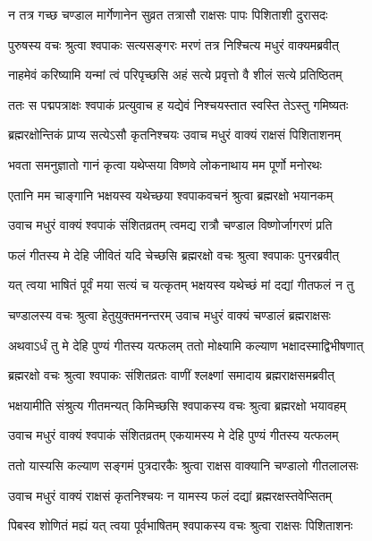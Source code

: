 \twolineshloka
{न तत्र गच्छ चण्डाल मार्गेणानेन सुव्रत}
{तत्रासौ राक्षसः पापः पिशिताशी दुरासदः}%

\twolineshloka
{पुरुषस्य वचः श्रुत्वा श्वपाकः सत्यसङ्गरः}
{मरणं तत्र निश्चित्य मधुरं वाक्यमब्रवीत्}%

\twolineshloka
{नाहमेवं करिष्यामि यन्मां त्वं परिपृच्छसि}
{अहं सत्ये प्रवृत्तो वै शीलं सत्ये प्रतिष्ठितम्}%

\twolineshloka
{ततः स पद्मपत्राक्षः श्वपाकं प्रत्युवाच ह}
{यद्येवं निश्चयस्तात स्वस्ति तेऽस्तु गमिष्यतः}%

\twolineshloka
{ब्रह्मरक्षोन्तिकं प्राप्य सत्येऽसौ कृतनिश्चयः}
{उवाच मधुरं वाक्यं राक्षसं पिशिताशनम्}%

\twolineshloka
{भवता समनुज्ञातो गानं कृत्वा यथेप्सया}
{विष्णवे लोकनाथाय मम पूर्णो मनोरथः}%

\twolineshloka
{एतानि मम चाङ्गानि भक्षयस्व यथेच्छया}
{श्वपाकवचनं श्रुत्वा ब्रह्मरक्षो भयानकम्}%

\twolineshloka
{उवाच मधुरं वाक्यं श्वपाकं संशितव्रतम्}
{त्वमद्य रात्रौ चण्डाल विष्णोर्जागरणं प्रति}%

\twolineshloka
{फलं गीतस्य मे देहि जीवितं यदि चेच्छसि}
{ब्रह्मरक्षो वचः श्रुत्वा श्वपाकः पुनरब्रवीत्}%

\twolineshloka
{यत् त्वया भाषितं पूर्वं मया सत्यं च यत्कृतम्}
{भक्षयस्व यथेच्छं मां दद्यां गीतफलं न तु}%

\twolineshloka
{चण्डालस्य वचः श्रुत्वा हेतुयुक्तमनन्तरम्}
{उवाच मधुरं वाक्यं चण्डालं ब्रह्मराक्षसः}%

\twolineshloka
{अथवाऽर्धं तु मे देहि पुण्यं गीतस्य यत्फलम्}
{ततो मोक्ष्यामि कल्याण भक्षादस्माद्विभीषणात्}%

\twolineshloka
{ब्रह्मरक्षो वचः श्रुत्वा श्वपाकः संशितव्रतः}
{वाणीं श्लक्ष्णां समादाय ब्रह्मराक्षसमब्रवीत्}%

\twolineshloka
{भक्षयामीति संश्रुत्य गीतमन्यत् किमिच्छसि}
{श्वपाकस्य वचः श्रुत्वा ब्रह्मरक्षो भयावहम्}%

\twolineshloka
{उवाच मधुरं वाक्यं श्वपाकं संशितव्रतम्}
{एकयामस्य मे देहि पुण्यं गीतस्य यत्फलम्}%

\twolineshloka
{ततो यास्यसि कल्याण सङ्गमं पुत्रदारकैः}
{श्रुत्वा राक्षस वाक्यानि चण्डालो गीतलालसः}%

\twolineshloka
{उवाच मधुरं वाक्यं राक्षसं कृतनिश्चयः}
{न यामस्य फलं दद्यां ब्रह्मरक्षस्तवेप्सितम्}%

\twolineshloka
{पिबस्व शोणितं मह्यं यत् त्वया पूर्वभाषितम्}
{श्वपाकस्य वचः श्रुत्वा राक्षसः पिशिताशनः}%

